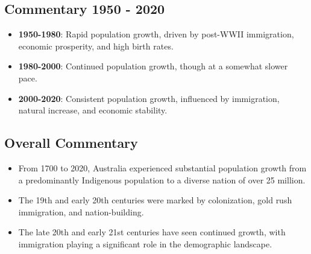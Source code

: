 \subsection*{Commentary 1950 - 2020}
\begin{itemize}
    \item \textbf{1950-1980}: Rapid population growth, driven by post-WWII immigration, economic prosperity, and high birth rates.
    \item \textbf{1980-2000}: Continued population growth, though at a somewhat slower pace.
    \item \textbf{2000-2020}: Consistent population growth, influenced by immigration, natural increase, and economic stability.
\end{itemize}

\subsection*{Overall Commentary}
\begin{itemize}
    \item From 1700 to 2020, Australia experienced substantial population growth from a predominantly Indigenous population to a diverse nation of over 25 million.
    \item The 19th and early 20th centuries were marked by colonization, gold rush immigration, and nation-building.
    \item The late 20th and early 21st centuries have seen continued growth, with immigration playing a significant role in the demographic landscape.
\end{itemize}